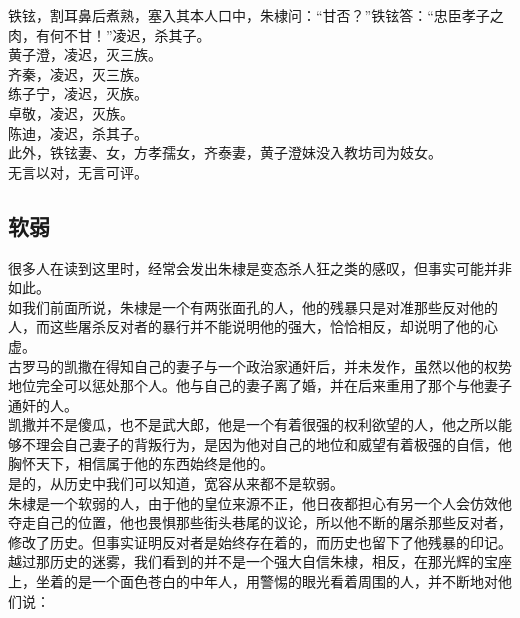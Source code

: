 \begin{multicols}{\theparacolNo}
铁铉，割耳鼻后煮熟，塞入其本人口中，朱棣问：“甘否？”铁铉答：“忠臣孝子之肉，有何不甘！”凌迟，杀其子。\\

黄子澄，凌迟，灭三族。\\

齐秦，凌迟，灭三族。\\

练子宁，凌迟，灭族。\\

卓敬，凌迟，灭族。\\

陈迪，凌迟，杀其子。\\

此外，铁铉妻、女，方孝孺女，齐泰妻，黄子澄妹没入教坊司为妓女。\\

无言以对，无言可评。\\

\subsection{软弱}
很多人在读到这里时，经常会发出朱棣是变态杀人狂之类的感叹，但事实可能并非如此。\\

如我们前面所说，朱棣是一个有两张面孔的人，他的残暴只是对准那些反对他的人，而这些屠杀反对者的暴行并不能说明他的强大，恰恰相反，却说明了他的心虚。\\

古罗马的凯撒在得知自己的妻子与一个政治家通奸后，并未发作，虽然以他的权势地位完全可以惩处那个人。他与自己的妻子离了婚，并在后来重用了那个与他妻子通奸的人。\\

凯撒并不是傻瓜，也不是武大郎，他是一个有着很强的权利欲望的人，他之所以能够不理会自己妻子的背叛行为，是因为他对自己的地位和威望有着极强的自信，他胸怀天下，相信属于他的东西始终是他的。\\

是的，从历史中我们可以知道，宽容从来都不是软弱。\\

朱棣是一个软弱的人，由于他的皇位来源不正，他日夜都担心有另一个人会仿效他夺走自己的位置，他也畏惧那些街头巷尾的议论，所以他不断的屠杀那些反对者，修改了历史。但事实证明反对者是始终存在着的，而历史也留下了他残暴的印记。\\

越过那历史的迷雾，我们看到的并不是一个强大自信朱棣，相反，在那光辉的宝座上，坐着的是一个面色苍白的中年人，用警惕的眼光看着周围的人，并不断地对他们说：\\


\end{multicols}
